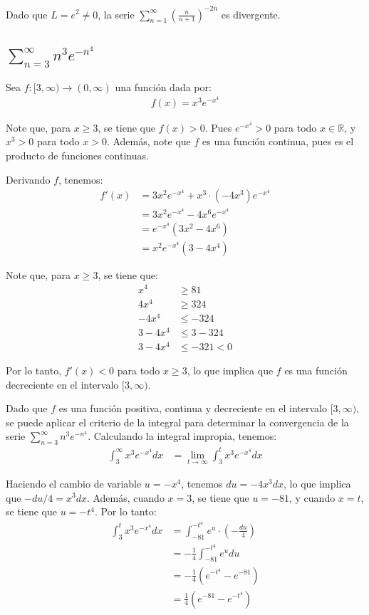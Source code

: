 \documentclass{article}
\newcommand{\R}{\mathbb{R}}
\begin{document}
Dado que $L = e^2 \neq 0$, la serie $\sum_{n=1}^{\infty} (\frac{n}{n+1})^{-2n}$ es divergente.

\subsection{$\sum_{n=3}^{\infty} n^3 e^{-n^4}$}

Sea $f : [3, \infty)  \to (0, \infty)$ una función dada por:
\begin{align*}
f(x) = x^3 e^{-x^4}
\end{align*}

Note que, para $x \geq 3$, se tiene que $f(x) > 0$. Pues $e^{-x^4} > 0$ para todo $x \in \R$, y $x^3 > 0$ para todo $x > 0$. Además, note que $f$ es una función continua, pues es el producto de funciones continuas.

Derivando $f$, tenemos:
\begin{align*}
f'(x) &= 3x^2 e^{-x^4} + x^3 \cdot (-4x^3) e^{-x^4} \\
&= 3x^2 e^{-x^4} - 4x^6 e^{-x^4} \\
&= e^{-x^4} (3x^2 - 4x^6) \\
&= x^2 e^{-x^4} (3 - 4x^4)
\end{align*}

Note que, para $x \geq 3$, se tiene que:
\begin{align*}
x^4 &\geq 81 \\
4x^4 &\geq 324 \\
-4x^4 &\leq -324 \\
3 - 4x^4 &\leq 3 - 324 \\
3 - 4x^4 &\leq -321 < 0
\end{align*}

Por lo tanto, $f'(x) < 0$ para todo $x \geq 3$, lo que implica que $f$ es una función decreciente en el intervalo $[3, \infty)$.

Dado que $f$ es una función positiva, continua y decreciente en el intervalo $[3, \infty)$, se puede aplicar el criterio de la integral para determinar la convergencia de la serie $\sum_{n=3}^{\infty} n^3 e^{-n^4}$.
Calculando la integral impropia, tenemos:
\begin{align*}
\int_3^{\infty} x^3 e^{-x^4} dx &= \lim_{t \to \infty} \int_3^t x^3 e^{-x^4} dx
\end{align*}

Haciendo el cambio de variable $u = -x^4$, tenemos $du = -4x^3 dx$, lo que implica que $-du/4 = x^3 dx$. Además, cuando $x = 3$, se tiene que $u = -81$, y cuando $x = t$, se tiene que $u = -t^4$. Por lo tanto:
\begin{align*}
\int_3^t x^3 e^{-x^4} dx &= \int_{-81}^{-t^4} e^u \cdot \left(-\frac{du}{4}\right) \\
&= -\frac{1}{4} \int_{-81}^{-t^4} e^u du \\
&= -\frac{1}{4} \left( e^{-t^4} - e^{-81} \right) \\
&= \frac{1}{4} \left( e^{-81} - e^{-t^4} \right)
\end{align*}
\end{document}
